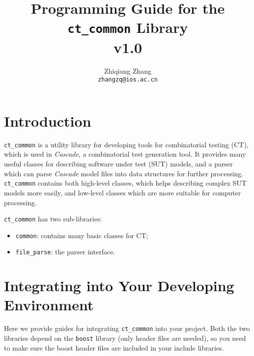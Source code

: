 \documentclass{article}
\begin{document}
\title{Programming Guide for the {\tt ct\_common} Library\\v1.0}
\author{Zhiqiang Zhang\\{\tt zhangzq@ios.ac.cn}}
\date{}
\maketitle
\tableofcontents
\section{Introduction}
{\tt ct\_common} is a utility library for developing tools for combinatorial testing (CT),
which is used in \emph{Cascade}, a combinatorial test generation tool.
It provides many useful classes for describing software under test (SUT) models,
and a parser which can parse \emph{Cascade} model files into data structures for
further processing. {\tt ct\_common} contains both high-level classes, which helps
describing complex SUT models more easily, and low-level classes which are more suitable
for computer processing.

{\tt ct\_common} has two sub-libraries:
\begin{itemize}
\item {\tt common}: contains many basic classes for CT;
\item {\tt file\_parse}: the parser interface.
\end{itemize}

\section{Integrating into Your Developing \mbox{Environment}}
Here we provide guides for integrating {\tt ct\_common} into your project.
Both the two libraries depend on the {\tt boost} library (only header files are needed),
so you need to make sure the boost header files are included in your include libraries.
\end{document}
